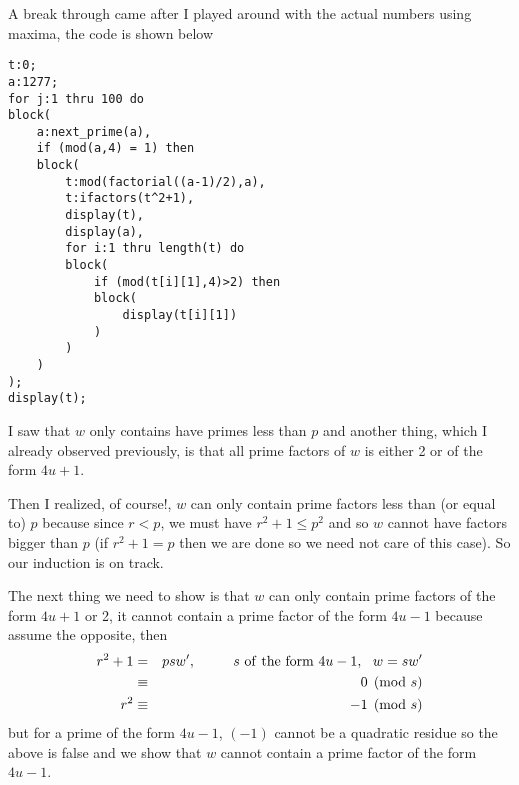 \documentclass[aps,preprint,preprintnumbers,nofootinbib,showpacs,prd]{revtex4-1}
\newcommand{\nbea}{\begin{eqnarray*}}
\newcommand{\neea}{\end{eqnarray*}}
\begin{document}
A break through came after I played around with the actual numbers using maxima, the code is shown below
%
\begin{verbatim}
t:0;
a:1277;
for j:1 thru 100 do
block(
    a:next_prime(a),
    if (mod(a,4) = 1) then 
    block(
        t:mod(factorial((a-1)/2),a),
        t:ifactors(t^2+1),
        display(t),
        display(a),
        for i:1 thru length(t) do
        block(
            if (mod(t[i][1],4)>2) then
            block(
                display(t[i][1])
            ) 
        )
    )  
);
display(t);
\end{verbatim}
%
I saw that $w$ only contains have primes less than $p$ and another thing, which I already observed previously, is that all prime factors of $w$ is either 2 or of the form $4u+1$.

Then I realized, of course!, $w$ can only contain prime factors less than (or equal to) $p$ because since $r < p$, we must have $r^2 + 1 \le p^2$ and so $w$ cannot have factors bigger than $p$ (if $r^2 + 1 = p$ then we are done so we need not care of this case). So our induction is on track.

The next thing we need to show is that $w$ can only contain prime factors of the form $4u+1$ or 2, it cannot contain a prime factor of the form $4u-1$ because assume the opposite, then
%
\nbea
r^2 + 1 & = & p s w', ~~~~~~~~ s{\rm~of~the~form~} 4u-1, ~~w = sw' \\
& \equiv & 0 \pmod{s} \\
r^2 & \equiv & - 1 \pmod{s}
\neea
%
but for a prime of the form $4u-1$, $(-1)$ cannot be a quadratic residue so the above is false and we show that $w$ cannot contain a prime factor of the form $4u-1$.
\end{document}
